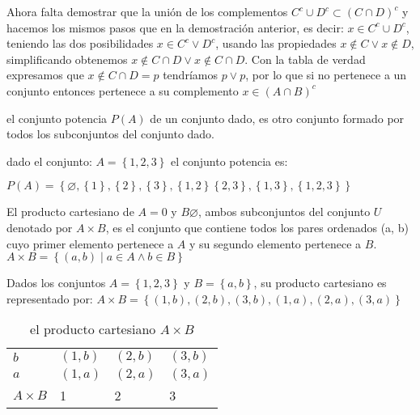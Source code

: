 Ahora falta demostrar que la unión de los complementos $C^{c} \cup D^{c} \subset (C \cap D)^{c}$ y hacemos los mismos pasos que en la demostración
anterior, es decir: $x \in C^{c} \cup D^{c}$, teniendo las dos posibilidades $x\in C^{c} \lor D^{c}$, usando las propiedades
$x\notin C\lor x\notin D$, simplificando obtenemos $x\notin C\cap D\lor x\notin C\cap D$. Con la tabla de verdad expresamos que $x\notin C\cap D=p$
tendríamos $p\lor p$, por lo que si no pertenece a un conjunto entonces pertenece a su complemento $x\in (A\cap B)^{c}$

\begin{definition}[Potenciación]
	el conjunto potencia $P(A)$ de un conjunto dado, es otro conjunto formado por todos los subconjuntos del conjunto dado.
\end{definition}

\begin{example} dado el conjunto:
	$A=\left\{1,2,3\right\}$ el conjunto potencia es:

	$P(A)=\left\{ \varnothing, \left\{1\right\}, \left\{2\right\}, \left\{3\right\}, \left\{1,2\right\}\left\{2,3\right\},\left\{1,3\right\}, \left\{1,2,3\right\} \right\}$
\end{example}


\begin{definition}
	El producto cartesiano de $A=0$ y $B\varnothing$, ambos subconjuntos del conjunto $U$ denotado por $A \times  B$, es el conjunto que contiene todos los pares ordenados (a, b) cuyo primer elemento pertenece a $A$ y su segundo elemento pertenece a $B$.
	$A \times B= \left\{ (a,b) \mid a\in A \land b\in B \right\} $
\end{definition}

\begin{example}
	Dados los conjuntos $A=\left\{1,2,3\right\}$ y $B=\left\{a,b\right\}$,
	su producto cartesiano es
	representado por: $A \times B= \left\{(1,b),(2,b),(3,b),(1,a),(2,a),(3,a)\right\} $
	\begin{table}[h!]
		\centering
		\begin{tabular}{l|lll}
			$b$          & $(1,b)$ & $(2,b)$ & $(3,b)$ \\
			$a$          & $(1,a)$ & $(2,a)$ & $(3,a)$ \\ \hline
			$A \times B$ & 1       & 2       & 3
		\end{tabular}
		\caption{el producto cartesiano $A \times B$}
		\label{tabfmc13}
	\end{table}
\end{example}

